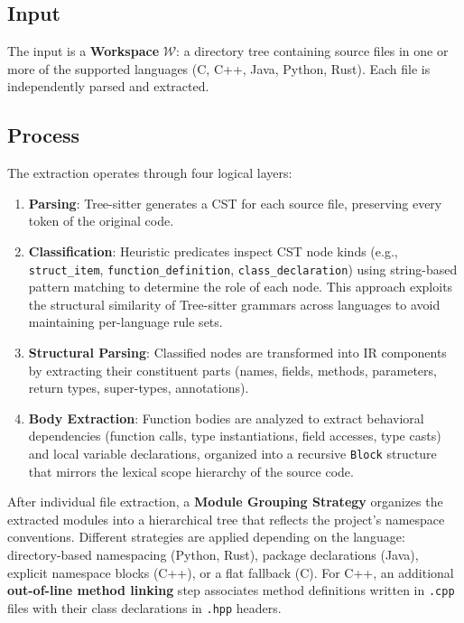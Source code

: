 \subsection{Input}

The input is a \textbf{Workspace} $\mathcal{W}$: a directory tree
containing source files in one or more of the supported languages (C,
C++, Java, Python, Rust). Each file is independently parsed and extracted.

\subsection{Process}

The extraction operates through four logical layers:

\begin{enumerate}
  \item \textbf{Parsing}: Tree-sitter generates a CST for each source
    file, preserving every token of the original code.
  \item \textbf{Classification}: Heuristic predicates inspect CST
    node kinds (e.g., \texttt{struct\_item},
    \texttt{function\_definition}, \texttt{class\_declaration}) using
    string-based pattern matching to determine the role of each node.
    This approach exploits the structural similarity of Tree-sitter
    grammars across languages to avoid maintaining per-language rule sets.
  \item \textbf{Structural Parsing}: Classified nodes are transformed
    into IR components by extracting their constituent parts (names,
    fields, methods, parameters, return types, super-types, annotations).
  \item \textbf{Body Extraction}: Function bodies are analyzed to
    extract behavioral dependencies (function calls, type
    instantiations, field accesses, type casts) and local variable
    declarations, organized into a recursive \texttt{Block} structure
    that mirrors the lexical scope hierarchy of the source code.
\end{enumerate}

After individual file extraction, a \textbf{Module Grouping Strategy}
organizes the extracted modules into a hierarchical tree that
reflects the project's namespace conventions. Different strategies
are applied depending on the language: directory-based namespacing
(Python, Rust), package declarations (Java), explicit namespace
blocks (C++), or a flat fallback (C). For C++, an additional
\textbf{out-of-line method linking} step associates method
definitions written in \texttt{.cpp} files with their class
declarations in \texttt{.hpp} headers.

